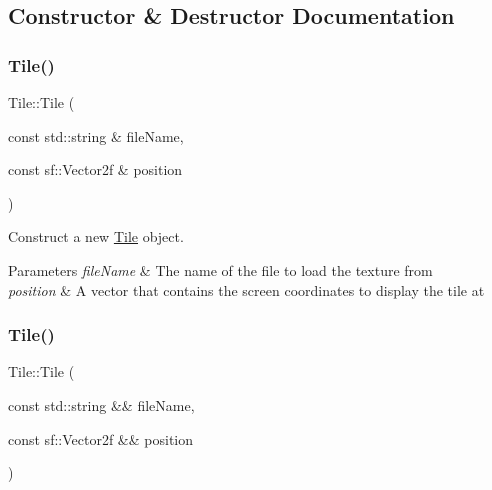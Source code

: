 \subsection{Constructor \& Destructor Documentation}
\mbox{\label{classTile_aa56994a706f8b5f5468d7fa7c9820346}} 
\subsubsection{\texorpdfstring{Tile()}{Tile()}\hspace{0.1cm}{\footnotesize\ttfamily [1/3]}}
{\footnotesize\ttfamily Tile\+::\+Tile (\begin{DoxyParamCaption}\item[{const std\+::string \&}]{file\+Name,  }\item[{const sf\+::\+Vector2f \&}]{position }\end{DoxyParamCaption})\hspace{0.3cm}{\ttfamily [explicit]}}



Construct a new \mbox{\hyperlink{classTile}{Tile}} object. 


\begin{DoxyParams}{Parameters}
{\em file\+Name} & The name of the file to load the texture from \\
\hline
{\em position} & A vector that contains the screen coordinates to display the tile at \\
\hline
\end{DoxyParams}
\mbox{\label{classTile_a6583b7a8d50b38d972865eb3440251fc}} 
\subsubsection{\texorpdfstring{Tile()}{Tile()}\hspace{0.1cm}{\footnotesize\ttfamily [2/3]}}
{\footnotesize\ttfamily Tile\+::\+Tile (\begin{DoxyParamCaption}\item[{const std\+::string \&\&}]{file\+Name,  }\item[{const sf\+::\+Vector2f \&\&}]{position }\end{DoxyParamCaption})\hspace{0.3cm}{\ttfamily [explicit]}}



